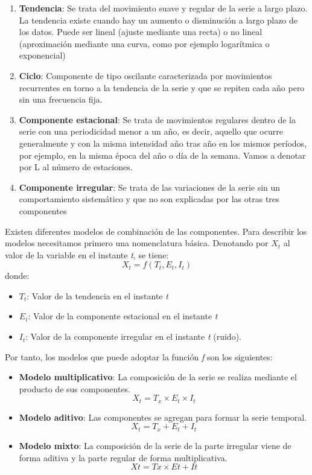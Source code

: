 \documentclass[12pt,a4paper,]{book}
\providecommand{\tightlist}{%
  \setlength{\itemsep}{0pt}\setlength{\parskip}{0pt}}
\numberwithin{dummy}{section}
\theoremstyle{ocrenumbox}
\theoremstyle{blacknumex}
\theoremstyle{blacknumbox}
\theoremstyle{ocrenum}
\theoremstyle{ocrenum}
\begin{document}
\begin{enumerate}
\def\labelenumi{\arabic{enumi}.}
\item
  \textbf{Tendencia}: Se trata del movimiento suave y regular de la
  serie a largo plazo. La tendencia existe cuando hay un aumento o
  disminución a largo plazo de los datos. Puede ser lineal (ajuste
  mediante una recta) o no lineal (aproximación mediante una curva, como
  por ejemplo logarítmica o exponencial)
\item
  \textbf{Ciclo}: Componente de tipo oscilante caracterizada por
  movimientos recurrentes en torno a la tendencia de la serie y que se
  repiten cada año pero sin una frecuencia fija.
\item
  \textbf{Componente estacional}: Se trata de movimientos regulares
  dentro de la serie con una periodicidad menor a un año, es decir,
  aquello que ocurre generalmente y con la misma intensidad año tras año
  en los mismos períodos, por ejemplo, en la misma época del año o día
  de la semana. Vamos a denotar por L al número de estaciones.
\item
  \textbf{Componente irregular}: Se trata de las variaciones de la serie
  sin un comportamiento sistemático y que no son explicadas por las
  otras tres componentes
\end{enumerate}

Existen diferentes modelos de combinación de las componentes. Para
describir los modelos necesitamos primero una nomenclatura básica.
Denotando por \(X_t\) al valor de la variable en el instante \emph{t},
se tiene: \[ X_t = f(T_t,E_t,I_t)\] donde:

\begin{itemize}
\tightlist
\item
  \(T_t\): Valor de la tendencia en el instante \emph{t}
\item
  \(E_t\): Valor de la componente estacional en el instante \emph{t}
\item
  \(I_t\): Valor de la componente irregular en el instante \emph{t}
  (ruido).
\end{itemize}

Por tanto, los modelos que puede adoptar la función \emph{f} son los
siguientes:

\begin{itemize}
\tightlist
\item
  \textbf{Modelo multiplicativo}: La composición de la serie se realiza
  mediante el producto de sus componentes.
  \[X_t = T_x \times E_t \times I_t\]
\item
  \textbf{Modelo aditivo}: Las componentes se agregan para formar la
  serie temporal. \[X_t = T_x + E_t + I_t\]
\item
  \textbf{Modelo mixto}: La composición de la serie de la parte
  irregular viene de forma aditiva y la parte regular de forma
  multiplicativa. \[Xt=Tx \times Et + It\]
\end{itemize}
\end{document}
